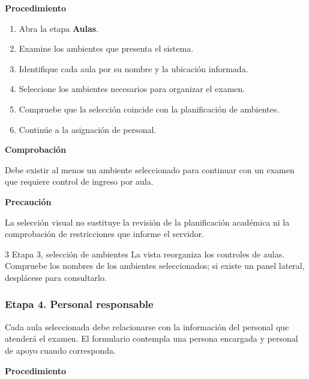 \noindent\textbf{Procedimiento}

\begin{enumerate}
    \item Abra la etapa \textbf{Aulas}.

    \item Examine los ambientes que presenta
    el sistema.

    \item Identifique cada aula por su nombre
    y la ubicación informada.

    \item Seleccione los ambientes necesarios
    para organizar el examen.

    \item Compruebe que la selección coincide
    con la planificación de ambientes.

    \item Continúe a la asignación de personal.
\end{enumerate}

\noindent\textbf{Comprobación}

Debe existir al menos un ambiente seleccionado
para continuar con un examen que requiere control
de ingreso por aula.

\noindent\textbf{Precaución}

La selección visual no sustituye la revisión de
la planificación académica ni la comprobación
de restricciones que informe el servidor.

\CapturasRegistro
{3}
{Etapa 3, selección de ambientes}
{La vista reorganiza los controles de aulas.
Compruebe los nombres de los ambientes seleccionados;
si existe un panel lateral, desplácese para consultarlo.}


\subsubsection{Etapa 4. Personal responsable}

Cada aula seleccionada debe relacionarse con
la información del personal que atenderá
el examen. El formulario contempla una persona
encargada y personal de apoyo cuando corresponda.

\noindent\textbf{Procedimiento}

